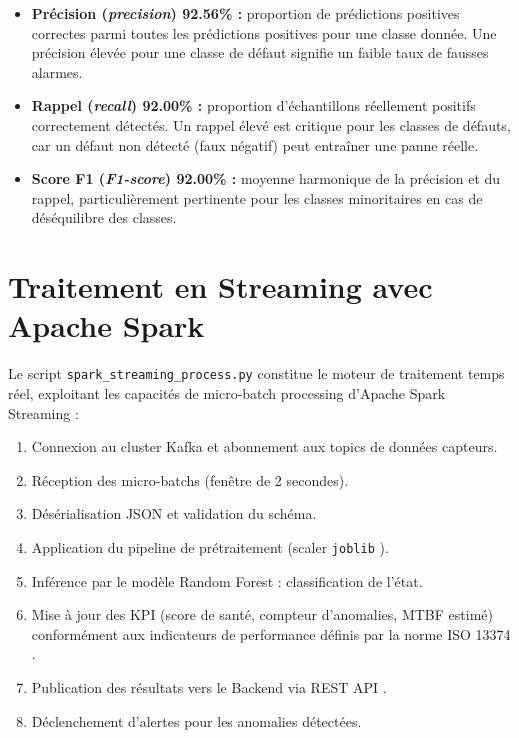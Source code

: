 \documentclass[12pt, a4paper, oneside]{report}
\begin{document}
\begin{itemize}
  \item \textbf{Précision (\textit{precision}) 92.56\% :} proportion de prédictions positives
  correctes parmi toutes les prédictions positives pour une classe donnée. Une précision
  élevée pour une classe de défaut signifie un faible taux de fausses alarmes.
  
  \item \textbf{Rappel (\textit{recall}) 92.00\% :} proportion d'échantillons réellement
  positifs correctement détectés. Un rappel élevé est critique pour les classes de
  défauts, car un défaut non détecté (faux négatif) peut entraîner une panne réelle.
  
  \item \textbf{Score F1 (\textit{F1-score}) 92.00\% :} moyenne harmonique de la précision et
  du rappel, particulièrement pertinente pour les classes minoritaires en cas de
  déséquilibre des classes.
\end{itemize}


\section{Traitement en Streaming avec Apache Spark}

Le script \texttt{spark\_streaming\_process.py} constitue le moteur de traitement temps réel,
exploitant les capacités de micro-batch processing d'Apache Spark Streaming \cite{spark} :

\begin{enumerate}
  \item Connexion au cluster Kafka \cite{kafka} et abonnement aux topics de données capteurs.
  \item Réception des micro-batchs (fenêtre de 2 secondes).
  \item Désérialisation JSON et validation du schéma.
  \item Application du pipeline de prétraitement (scaler \texttt{joblib} \cite{sklearn}).
  \item Inférence par le modèle Random Forest \cite{breiman2001} : classification de l'état.
  \item Mise à jour des KPI (score de santé, compteur d'anomalies, MTBF estimé) conformément
  aux indicateurs de performance définis par la norme ISO 13374 \cite{iso13374}.
  \item Publication des résultats vers le Backend via REST API \cite{springboot}.
  \item Déclenchement d'alertes pour les anomalies détectées.
\end{enumerate}
\end{document}
